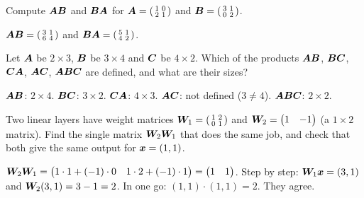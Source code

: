 \begin{exercise}
Compute $\bm{A}\bm{B}$ and $\bm{B}\bm{A}$ for
$\bm{A} = \left(\begin{smallmatrix} 1 & 0\\ 2 & 1\end{smallmatrix}\right)$ and
$\bm{B} = \left(\begin{smallmatrix} 3 & 1\\ 0 & 2\end{smallmatrix}\right)$.
\end{exercise}
\begin{solution}
$\bm{A}\bm{B} = \left(\begin{smallmatrix} 3 & 1\\ 6 & 4\end{smallmatrix}\right)$ and
$\bm{B}\bm{A} = \left(\begin{smallmatrix} 5 & 1\\ 4 & 2\end{smallmatrix}\right)$.
\end{solution}

\begin{exercise}
Let $\bm{A}$ be $2\times3$, $\bm{B}$ be $3\times4$ and $\bm{C}$ be $4\times2$. Which of
the products $\bm{A}\bm{B}$, $\bm{B}\bm{C}$, $\bm{C}\bm{A}$, $\bm{A}\bm{C}$, $\bm{A}\bm{B}\bm{C}$ are defined, and
what are their sizes?
\end{exercise}
\begin{solution}
$\bm{A}\bm{B}$: $2\times4$. $\bm{B}\bm{C}$: $3\times2$. $\bm{C}\bm{A}$: $4\times3$. $\bm{A}\bm{C}$: not
defined ($3 \neq 4$). $\bm{A}\bm{B}\bm{C}$: $2\times2$.
\end{solution}

\begin{exercise}
Two linear layers have weight matrices
$\bm{W}_1 = \left(\begin{smallmatrix} 1 & 2\\ 0 & 1\end{smallmatrix}\right)$ and
$\bm{W}_2 = \begin{pmatrix} 1 & -1\end{pmatrix}$ (a $1\times2$ matrix). Find the
single matrix $\bm{W}_2\bm{W}_1$ that does the same job, and check that both give the
same output for $\bm{x} = (1, 1)$.
\end{exercise}
\begin{solution}
$\bm{W}_2\bm{W}_1 = \begin{pmatrix} 1\cdot1 + (-1)\cdot0 & 1\cdot2 + (-1)\cdot1
\end{pmatrix} = \begin{pmatrix} 1 & 1\end{pmatrix}$. Step by step:
$\bm{W}_1\bm{x} = (3, 1)$ and $\bm{W}_2(3, 1) = 3 - 1 = 2$. In one go:
$(1, 1)\cdot(1, 1) = 2$. They agree.
\end{solution}


